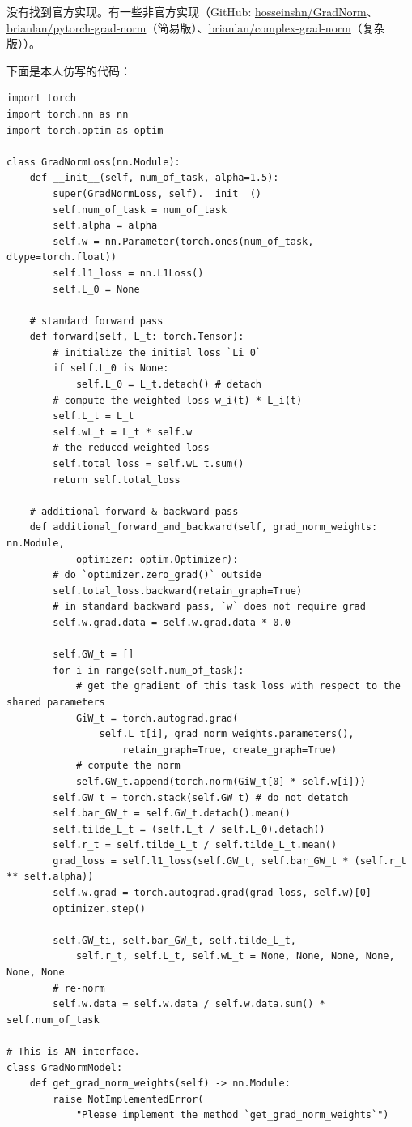 \documentclass{ctexart}
\begin{document}
没有找到官方实现。有一些非官方实现（GitHub: \href{https://github.com/hosseinshn/GradNorm}{hosseinshn/GradNorm}、\href{https://github.com/brianlan/pytorch-grad-norm}{brianlan/pytorch-grad-norm}（简易版）、\href{https://github.com/brianlan/complex-grad-norm}{brianlan/complex-grad-norm}（复杂版））。

下面是本人仿写的代码：
\begin{verbatim}
import torch
import torch.nn as nn
import torch.optim as optim

class GradNormLoss(nn.Module):
    def __init__(self, num_of_task, alpha=1.5):
        super(GradNormLoss, self).__init__()
        self.num_of_task = num_of_task
        self.alpha = alpha
        self.w = nn.Parameter(torch.ones(num_of_task, dtype=torch.float))
        self.l1_loss = nn.L1Loss()
        self.L_0 = None

    # standard forward pass
    def forward(self, L_t: torch.Tensor):
        # initialize the initial loss `Li_0`
        if self.L_0 is None:
            self.L_0 = L_t.detach() # detach
        # compute the weighted loss w_i(t) * L_i(t)
        self.L_t = L_t
        self.wL_t = L_t * self.w
        # the reduced weighted loss
        self.total_loss = self.wL_t.sum()
        return self.total_loss

    # additional forward & backward pass
    def additional_forward_and_backward(self, grad_norm_weights: nn.Module, 
            optimizer: optim.Optimizer):
        # do `optimizer.zero_grad()` outside
        self.total_loss.backward(retain_graph=True)
        # in standard backward pass, `w` does not require grad
        self.w.grad.data = self.w.grad.data * 0.0

        self.GW_t = []
        for i in range(self.num_of_task):
            # get the gradient of this task loss with respect to the shared parameters
            GiW_t = torch.autograd.grad(
                self.L_t[i], grad_norm_weights.parameters(),
                    retain_graph=True, create_graph=True)
            # compute the norm
            self.GW_t.append(torch.norm(GiW_t[0] * self.w[i]))
        self.GW_t = torch.stack(self.GW_t) # do not detatch
        self.bar_GW_t = self.GW_t.detach().mean()
        self.tilde_L_t = (self.L_t / self.L_0).detach()
        self.r_t = self.tilde_L_t / self.tilde_L_t.mean()
        grad_loss = self.l1_loss(self.GW_t, self.bar_GW_t * (self.r_t ** self.alpha))
        self.w.grad = torch.autograd.grad(grad_loss, self.w)[0]
        optimizer.step()

        self.GW_ti, self.bar_GW_t, self.tilde_L_t, 
            self.r_t, self.L_t, self.wL_t = None, None, None, None, None, None
        # re-norm
        self.w.data = self.w.data / self.w.data.sum() * self.num_of_task

# This is AN interface.
class GradNormModel:
    def get_grad_norm_weights(self) -> nn.Module:
        raise NotImplementedError(
            "Please implement the method `get_grad_norm_weights`")
\end{verbatim}
\end{document}
